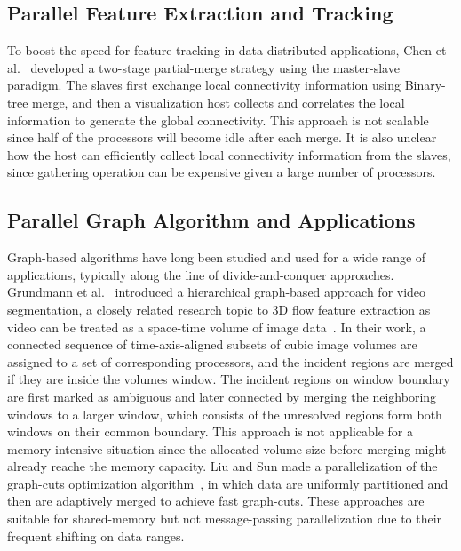 \subsection{Parallel Feature Extraction and Tracking}

To boost the speed for feature tracking in data-distributed applications, Chen et al.~\cite{Chen03realtime} developed a two-stage partial-merge strategy using the master-slave paradigm. The slaves first exchange local connectivity information using Binary-tree merge, and then a visualization host collects and correlates the local information to generate the global connectivity. This approach is not scalable since half of the processors will become idle after each merge. It is also unclear how the host can efficiently collect local connectivity information from the slaves, since gathering operation can be expensive given a large number of processors.

\subsection{Parallel Graph Algorithm and Applications}

Graph-based algorithms have long been studied and used for a wide range of applications, typically along the line of divide-and-conquer approaches. Grundmann et al.~\cite{36247} introduced a hierarchical graph-based approach for video segmentation, a closely related research topic to 3D flow feature extraction as video can be treated as a space-time volume of image data~\cite{Klein2002}. In their work, a connected sequence of time-axis-aligned subsets of cubic image volumes are assigned to a set of corresponding processors, and the incident regions are merged if they are inside the volumes window. The incident regions on window boundary are first marked as ambiguous and later connected by merging the neighboring windows to a larger window, which consists of the unresolved regions form both windows on their common boundary. This approach is not applicable for a memory intensive situation since the allocated volume size before merging might already reache the memory capacity. Liu and Sun \cite{Liu2010} made a parallelization of the graph-cuts optimization algorithm~\cite{Boykov2004}, in which data are uniformly partitioned and then are adaptively merged to achieve fast graph-cuts. These approaches are suitable for shared-memory but not message-passing parallelization due to their frequent shifting on data ranges.
